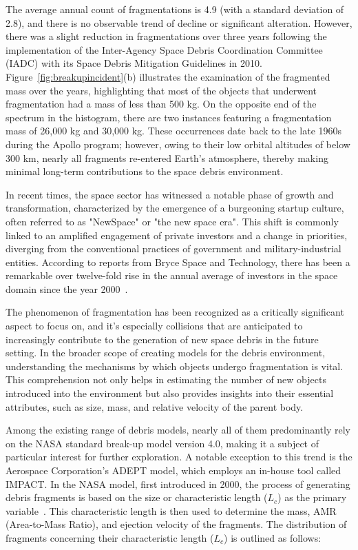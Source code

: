 \documentclass[letterpaper, paper,11pt]{AAS}
\begin{document}
The average annual count of fragmentations is 4.9 (with a standard deviation of 2.8), and there is no observable trend of decline or significant alteration. However, there was a slight reduction in fragmentations over three years following the implementation of the Inter-Agency Space Debris Coordination Committee (IADC) with its Space Debris Mitigation Guidelines in 2010. 
Figure~\ref{fig:breakupincident}(b) illustrates the examination of the fragmented mass over the years, highlighting that most of the objects that underwent fragmentation had a mass of less than 500 kg. On the opposite end of the spectrum in the histogram, there are two instances featuring a fragmentation mass of 26,000 kg and 30,000 kg. These occurrences date back to the late 1960s during the Apollo program; however, owing to their low orbital altitudes of below 300 km, nearly all fragments re-entered Earth's atmosphere, thereby making minimal long-term contributions to the space debris environment.

In recent times, the space sector has witnessed a notable phase of growth and transformation, characterized by the emergence of a burgeoning startup culture, often referred to as "NewSpace" or "the new space era". This shift is commonly linked to an amplified engagement of private investors and a change in priorities, diverging from the conventional practices of government and military-industrial entities. According to reports from Bryce Space and Technology, there has been a remarkable over twelve-fold rise in the annual average of investors in the space domain since the year 2000~\cite{diserens_newspace_2020}.

The phenomenon of fragmentation has been recognized as a critically significant aspect to focus on, and it's especially collisions that are anticipated to increasingly contribute to the generation of new space debris in the future setting. In the broader scope of creating models for the debris environment, understanding the mechanisms by which objects undergo fragmentation is vital. This comprehension not only helps in estimating the number of new objects introduced into the environment but also provides insights into their essential attributes, such as size, mass, and relative velocity of the parent body.

Among the existing range of debris models, nearly all of them predominantly rely on the NASA standard break-up model version 4.0, making it a subject of particular interest for further exploration. A notable exception to this trend is the Aerospace Corporation's ADEPT model, which employs an in-house tool called IMPACT. In the NASA model, first introduced in 2000, the process of generating debris fragments is based on the size or characteristic length ($L_c$) as the primary variable~\cite{jenkins_strathcube_2021}. This characteristic length is then used to determine the mass, AMR (Area-to-Mass Ratio), and ejection velocity of the fragments. The distribution of fragments concerning their characteristic length ($L_c$) is outlined as follows:
\end{document}
